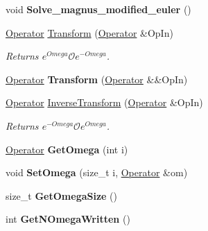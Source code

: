 \begin{DoxyCompactItemize}
\mbox{\label{classIMSRGSolver_a78db6a8078f65c5ef8f99508d13aa926}} 
void {\bfseries Solve\+\_\+magnus\+\_\+modified\+\_\+euler} ()
\item 
\mbox{\label{classIMSRGSolver_aead1fa352d16ddcd7e572749768a3c58}} 
\hyperlink{classOperator}{Operator} \hyperlink{classIMSRGSolver_aead1fa352d16ddcd7e572749768a3c58}{Transform} (\hyperlink{classOperator}{Operator} \&Op\+In)
\begin{DoxyCompactList}\small\item\em Returns $ e^{Omega} \mathcal{O} e^{-Omega} $. \end{DoxyCompactList}\item 
\mbox{\label{classIMSRGSolver_aa2475fc701ed990f1c2e982a0fd75e70}} 
\hyperlink{classOperator}{Operator} {\bfseries Transform} (\hyperlink{classOperator}{Operator} \&\&Op\+In)
\item 
\mbox{\label{classIMSRGSolver_a6e00fbe344b1853b73f422fb8d0f3b9a}} 
\hyperlink{classOperator}{Operator} \hyperlink{classIMSRGSolver_a6e00fbe344b1853b73f422fb8d0f3b9a}{Inverse\+Transform} (\hyperlink{classOperator}{Operator} \&Op\+In)
\begin{DoxyCompactList}\small\item\em Returns $ e^{-Omega} \mathcal{O} e^{Omega} $. \end{DoxyCompactList}\item 
\mbox{\label{classIMSRGSolver_a75e0b98af302f96137e65f912794f077}} 
\hyperlink{classOperator}{Operator} {\bfseries Get\+Omega} (int i)
\item 
\mbox{\label{classIMSRGSolver_a6566225ef8fdc60389955d5a4266ffdb}} 
void {\bfseries Set\+Omega} (size\+\_\+t i, \hyperlink{classOperator}{Operator} \&om)
\item 
\mbox{\label{classIMSRGSolver_ad759130ed7d7e230e81758c0bce7792d}} 
size\+\_\+t {\bfseries Get\+Omega\+Size} ()
\item 
\mbox{\label{classIMSRGSolver_a7d79821eb4c269f8d096cfe912a5b996}} 
int {\bfseries Get\+N\+Omega\+Written} ()
\item 

\end{DoxyCompactItemize}
